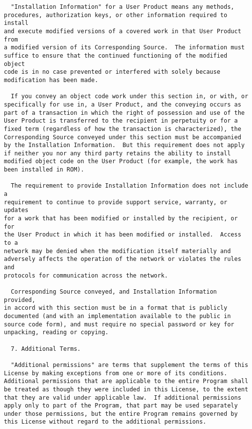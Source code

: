 \documentclass[11pt]{article}
\begin{document}
\begin{verbatim}
  "Installation Information" for a User Product means any methods,
procedures, authorization keys, or other information required to install
and execute modified versions of a covered work in that User Product from
a modified version of its Corresponding Source.  The information must
suffice to ensure that the continued functioning of the modified object
code is in no case prevented or interfered with solely because
modification has been made.

  If you convey an object code work under this section in, or with, or
specifically for use in, a User Product, and the conveying occurs as
part of a transaction in which the right of possession and use of the
User Product is transferred to the recipient in perpetuity or for a
fixed term (regardless of how the transaction is characterized), the
Corresponding Source conveyed under this section must be accompanied
by the Installation Information.  But this requirement does not apply
if neither you nor any third party retains the ability to install
modified object code on the User Product (for example, the work has
been installed in ROM).

  The requirement to provide Installation Information does not include a
requirement to continue to provide support service, warranty, or updates
for a work that has been modified or installed by the recipient, or for
the User Product in which it has been modified or installed.  Access to a
network may be denied when the modification itself materially and
adversely affects the operation of the network or violates the rules and
protocols for communication across the network.

  Corresponding Source conveyed, and Installation Information provided,
in accord with this section must be in a format that is publicly
documented (and with an implementation available to the public in
source code form), and must require no special password or key for
unpacking, reading or copying.

  7. Additional Terms.

  "Additional permissions" are terms that supplement the terms of this
License by making exceptions from one or more of its conditions.
Additional permissions that are applicable to the entire Program shall
be treated as though they were included in this License, to the extent
that they are valid under applicable law.  If additional permissions
apply only to part of the Program, that part may be used separately
under those permissions, but the entire Program remains governed by
this License without regard to the additional permissions.


\end{verbatim}
\end{document}
